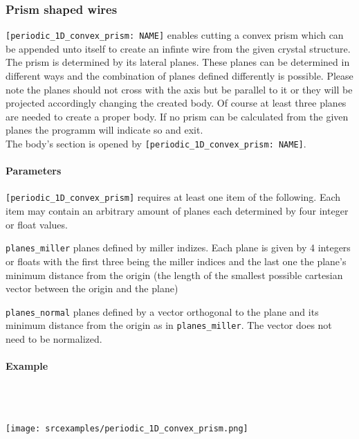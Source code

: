 \subsubsection{Prism shaped wires}
\lstinline{[periodic_1D_convex_prism: NAME]} enables cutting a convex prism which can be appended unto itself to create an infinte wire from the given crystal structure. The prism is determined by its lateral planes. These planes can be determined in different ways and the combination of planes defined differently is possible. Please note the planes should not cross with the axis but be parallel to it or they will be projected accordingly changing the created body. Of course at least three planes are needed to create a proper body. If no prism can be calculated from the given planes the programm will indicate so and exit.\\
The body's section is opened by \lstinline{[periodic_1D_convex_prism: NAME]}.

\paragraph{Parameters}
\lstinline{[periodic_1D_convex_prism]} requires at least one item of the following. Each item may contain an arbitrary amount of planes each determined by four integer or float values.

\begin{description}
 \item{\lstinline{planes_miller}} planes defined by miller indizes. Each plane is given by 4 integers or floats with the first three being the miller indices and the last one the plane's minimum distance from the origin (the length of the smallest possible cartesian vector between the origin and the plane)
 \item{\lstinline{planes_normal}} planes defined by a vector orthogonal to the plane and its minimum distance from the origin as in \lstinline{planes_miller}. The vector does not need to be normalized.
\end{description} 


\paragraph{Example}\


\ \\\texttt{[image: srcexamples/periodic\_1D\_convex\_prism.png]}